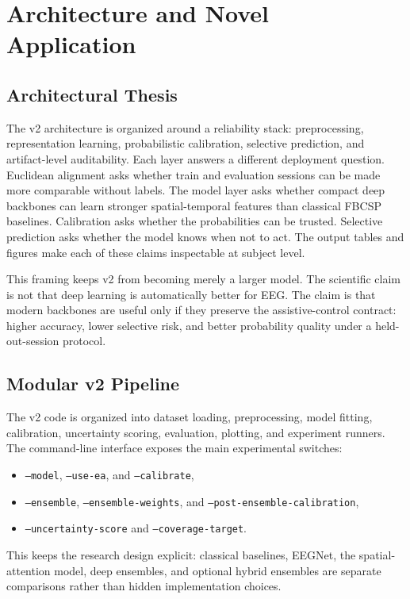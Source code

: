 \documentclass[11pt]{article}
\begin{document}
\section{Architecture and Novel Application}

\subsection{Architectural Thesis}

The v2 architecture is organized around a reliability stack: preprocessing,
representation learning, probabilistic calibration, selective prediction, and
artifact-level auditability. Each layer answers a different deployment
question. Euclidean alignment asks whether train and evaluation sessions can
be made more comparable without labels. The model layer asks whether compact
deep backbones can learn stronger spatial-temporal features than classical
FBCSP baselines. Calibration asks whether the probabilities can be trusted.
Selective prediction asks whether the model knows when not to act. The output
tables and figures make each of these claims inspectable at subject level.

This framing keeps v2 from becoming merely a larger model. The scientific
claim is not that deep learning is automatically better for EEG. The claim is
that modern backbones are useful only if they preserve the assistive-control
contract: higher accuracy, lower selective risk, and better probability
quality under a held-out-session protocol.

\subsection{Modular v2 Pipeline}

The v2 code is organized into dataset loading, preprocessing, model fitting,
calibration, uncertainty scoring, evaluation, plotting, and experiment runners.
The command-line interface exposes the main experimental switches:
\begin{itemize}
  \item \texttt{--model}, \texttt{--use-ea}, and \texttt{--calibrate},
  \item \texttt{--ensemble}, \texttt{--ensemble-weights}, and
  \texttt{--post-ensemble-calibration},
  \item \texttt{--uncertainty-score} and \texttt{--coverage-target}.
\end{itemize}
This keeps the research design explicit: classical baselines, EEGNet, the
spatial-attention model, deep ensembles, and optional hybrid ensembles are
separate comparisons rather than hidden implementation choices.
\end{document}
